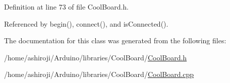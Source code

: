 Definition at line 73 of file Cool\+Board.\+h.



Referenced by begin(), connect(), and is\+Connected().



The documentation for this class was generated from the following files\+:\begin{DoxyCompactItemize}
\item 
/home/ashiroji/\+Arduino/libraries/\+Cool\+Board/\hyperlink{CoolBoard_8h}{Cool\+Board.\+h}\item 
/home/ashiroji/\+Arduino/libraries/\+Cool\+Board/\hyperlink{CoolBoard_8cpp}{Cool\+Board.\+cpp}\end{DoxyCompactItemize}
